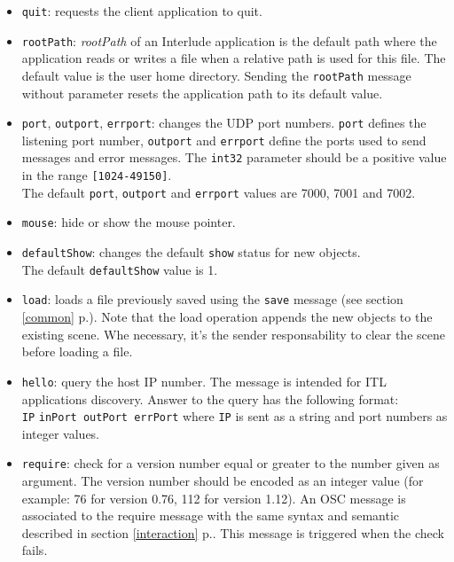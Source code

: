 \documentclass[a4paper,twoside]{report}
\newcommand{\fullref}[1]	{\ref{#1} p.\pageref{#1}}
\newcommand{\OSC}[1]		{\texttt{#1}}
\newcommand{\values}[1]	{\texttt{#1}}
\newcommand{\example}		{\hspace*{1cm}}
\begin{document}
\begin{itemize}
\item \OSC{quit}: requests the client application to quit.

\item \OSC{rootPath}: \emph{rootPath} of an Interlude application is the default path where the application reads or writes a file when a relative path is used for this file. The default value is the user home directory. Sending the \OSC{rootPath} message without parameter resets the application path to its default value.

\item \OSC{port}, \OSC{outport}, \OSC{errport}: changes the UDP port numbers. \OSC{port} defines the listening port number, \OSC{outport} and \OSC{errport} define the ports used to send messages and error messages. The \OSC{int32} parameter should be a positive value in the range \values{[1024-49150]}. \\
The default \OSC{port}, \OSC{outport} and \OSC{errport} values are 7000, 7001 and 7002.

\item \OSC{mouse}: hide or show the mouse pointer.

\item \OSC{defaultShow}: changes the default \OSC{show} status for new objects. \\
The default \OSC{defaultShow} value is 1.

\item \OSC{load}: loads a file previously saved using the \OSC{save} message (see section \fullref{common}). Note that the load operation appends the new objects to the existing scene. Whe necessary, it's the sender responsability to clear the scene before loading a file.

\item \OSC{hello}: query the host IP number. The message is intended for ITL applications discovery. Answer to the query has the following format: \\
\example \OSC{IP} \OSC{inPort outPort errPort} where \OSC{IP} is sent as a string and port numbers as integer values.

\item \OSC{require}: check for a version number equal or greater to the number given as argument. The version number should be encoded as an integer value (for example: 76 for version 0.76, 112 for version 1.12). An OSC message is associated to the require message with the same syntax and semantic described in section \fullref{interaction}. This message is triggered when the check fails.

\end{itemize}
\end{document}
